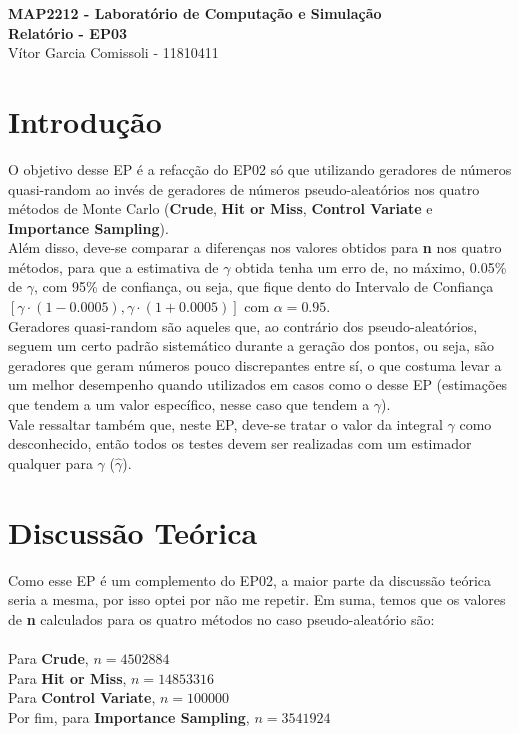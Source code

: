 \documentclass{article}
\begin{document}
\begin{center}
    \textbf{\LARGE MAP2212 - Laboratório de Computação e Simulação}\\
    \vspace{0.3cm}
    \textbf{\Large Relatório - EP03}\\
    \vspace{0.3cm}
    \large{Vítor Garcia Comissoli - 11810411}
\end{center}

\section{Introdução}

    O objetivo desse EP é a refacção do EP02 só que utilizando geradores de números quasi-random ao invés de geradores de números pseudo-aleatórios nos quatro métodos de Monte Carlo (\textbf{Crude}, \textbf{Hit or Miss}, \textbf{Control Variate} e \textbf{Importance Sampling}).\\
    
    Além disso, deve-se comparar a diferenças nos valores obtidos para \textbf{n} nos quatro métodos, para que a estimativa de $\gamma$ obtida tenha um erro de, no máximo, 0.05\% de $\gamma$, com 95\% de confiança, ou seja, que fique dento do Intervalo de Confiança $[\gamma\cdot(1 - 0.0005),\gamma\cdot(1 + 0.0005)]$ com $\alpha=0.95$.\\
    
    Geradores quasi-random são aqueles que, ao contrário dos pseudo-aleatórios, seguem um certo padrão sistemático durante a geração dos pontos, ou seja, são geradores que geram números pouco discrepantes entre sí, o que costuma levar a um melhor desempenho quando utilizados em casos como o desse EP (estimações que tendem a um valor específico, nesse caso que tendem a $\gamma$).\\
    
    Vale ressaltar também que, neste EP, deve-se tratar o valor da integral $\gamma$ como desconhecido, então todos os testes devem ser realizadas com um estimador qualquer para $\gamma$ ($\hat{\gamma}$).
    
\section{Discussão Teórica}
    
    Como esse EP é um complemento do EP02, a maior parte da discussão teórica  seria a mesma, por isso optei por não me repetir. Em suma, temos que os valores de \textbf{n} calculados para os quatro métodos no caso pseudo-aleatório são:\\
    \\
    Para \textbf{Crude}, $n = 4502884$\\
    Para \textbf{Hit or Miss}, $n = 14853316$\\
    Para \textbf{Control Variate}, $n =  100000$\\ 
    Por fim, para \textbf{Importance Sampling}, $n = 3541924$\\
    
\end{document}
